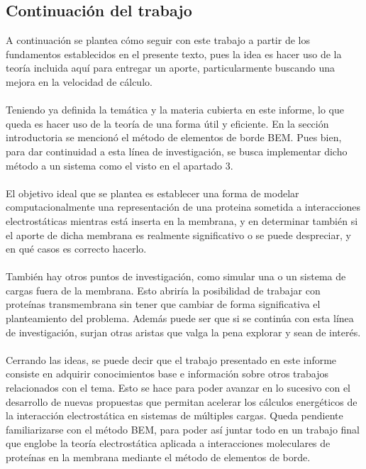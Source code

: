 \documentclass[12pt, notitlepage]{article}
\numberwithin{equation}{section}
\begin{document}
\subsection{Continuación del trabajo}
A continuación se plantea cómo seguir con este trabajo a partir de los fundamentos establecidos en el presente texto, pues la idea es hacer uso de la teoría incluida aquí para entregar un aporte, particularmente buscando una mejora en la velocidad de cálculo.\\\\
Teniendo ya definida la temática y la materia cubierta en este informe, lo que queda es hacer uso de la teoría de una forma útil y eficiente. En la sección introductoria se mencionó el método de elementos de borde BEM. Pues bien, para dar continuidad a esta línea de investigación, se busca implementar dicho método a un sistema como el visto en el apartado 3.\\\\
El objetivo ideal que se plantea es establecer una forma de modelar computacionalmente una representación de una proteina sometida a interacciones electrostáticas mientras está inserta en la membrana, y en determinar también si el aporte de dicha membrana es realmente significativo o se puede despreciar, y en qué casos es correcto hacerlo.\\\\
También hay otros puntos de investigación, como simular una o un sistema de cargas fuera de la membrana. Esto abriría la posibilidad de trabajar con proteínas transmembrana sin tener que cambiar de forma significativa el planteamiento del problema. Además puede ser que si se continúa con esta línea de investigación, surjan otras aristas que valga la pena explorar y sean de interés.\\\\
Cerrando las ideas, se puede decir que el trabajo presentado en este informe consiste en adquirir conocimientos base e información sobre otros trabajos relacionados con el tema. Esto se hace para poder avanzar en lo sucesivo con el desarrollo de nuevas propuestas que permitan acelerar los cálculos energéticos de la interacción electrostática en sistemas de múltiples cargas. Queda pendiente familiarizarse con el método BEM, para poder así juntar todo en un trabajo final que englobe la teoría electrostática aplicada a interacciones moleculares de proteínas en la membrana mediante el método de elementos de borde.


\pagebreak
\end{document}
